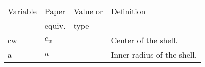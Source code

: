 \documentclass[10pt]{article}
\begin{document}
\begin{center}
\begin{tabular}{|l|l|p{1.0in}|p{3.8in}|}
\hline

Variable & Paper  & Value or &  Definition \\ 
         & equiv. &  type  & \\ \hline

cw       & $c_w$ & & Center of the shell.       \\

a        & $a$   & & Inner radius of the shell. \\ \hline
\end{tabular} \vspace{.1in}
\end{center}
%
\end{document}
